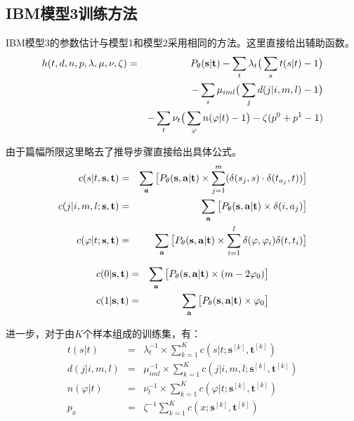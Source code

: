 \begin{appendices}

\section{IBM模型3训练方法}
\parinterval IBM模型3的参数估计与模型1和模型2采用相同的方法。这里直接给出辅助函数。
\begin{eqnarray}
h(t,d,n,p, \lambda,\mu, \nu, \zeta) & = &  {P}_{\theta}(\mathbf{s}|\mathbf{t})-\sum_{t}\lambda_{t}\big(\sum_{s}t(s|t)-1\big)  \nonumber \\
& & -\sum_{i}\mu_{iml}\big(\sum_{j}d(j|i,m,l)-1\big) \nonumber \\
& & -\sum_{t}\nu_{t}\big(\sum_{\varphi}n(\varphi|t)-1\big)-\zeta(p^0+p^1-1)
\label{eq:1.1}
\end{eqnarray}

\parinterval 由于篇幅所限这里略去了推导步骤直接给出具体公式。
\begin{eqnarray}
c(s|t,\mathbf{s},\mathbf{t}) & = & \sum_{\mathbf{a}}\big[{P}_{\theta}(\mathbf{s},\mathbf{a}|\mathbf{t}) \times \sum_{j=1}^{m} (\delta(s_j,s) \cdot \delta(t_{a_{j}},t))\big] \label{eq:1.2} \\
c(j|i,m,l;\mathbf{s},\mathbf{t}) & = & \sum_{\mathbf{a}}\big[{P}_{\theta}(\mathbf{s},\mathbf{a}|\mathbf{t}) \times \delta(i,a_j)\big] \label{eq:1.3} \\
c(\varphi|t;\mathbf{s},\mathbf{t}) & = & \sum_{\mathbf{a}}\big[{P}_{\theta}(\mathbf{s},\mathbf{a}|\mathbf{t}) \times \sum_{i=1}^{l}\delta(\varphi,\varphi_{i})\delta(t,t_i)\big]
\label{eq:1.4}
\end{eqnarray}

\begin{eqnarray}
c(0|\mathbf{s},\mathbf{t}) & = & \sum_{\mathbf{a}}\big[{P}_{\theta}(\mathbf{s},\mathbf{a}|\mathbf{t})  \times (m-2\varphi_0) \big] \label{eq:1.5} \\
c(1|\mathbf{s},\mathbf{t}) & = & \sum_{\mathbf{a}}\big[{P}_{\theta}(\mathbf{s},\mathbf{a}|\mathbf{t}) \times \varphi_0 \big] \label{eq:1.6}
\end{eqnarray}

\parinterval 进一步，对于由$K$个样本组成的训练集，有：
\begin{eqnarray}
t(s|t) & = & \lambda_{t}^{-1} \times \sum_{k=1}^{K}c(s|t;\mathbf{s}^{[k]},\mathbf{t}^{[k]}) \label{eq:1.7} \\
d(j|i,m,l) & = & \mu_{iml}^{-1} \times \sum_{k=1}^{K}c(j|i,m,l;\mathbf{s}^{[k]},\mathbf{t}^{[k]}) \label{eq:1.8} \\
n(\varphi|t) & = & \nu_{t}^{-1} \times \sum_{k=1}^{K}c(\varphi |t;\mathbf{s}^{[k]},\mathbf{t}^{[k]}) \label{eq:1.9} \\
p_x & = & \zeta^{-1} \sum_{k=1}^{K}c(x;\mathbf{s}^{[k]},\mathbf{t}^{[k]}) \label{eq:1.10}
\end{eqnarray}


\end{appendices}
